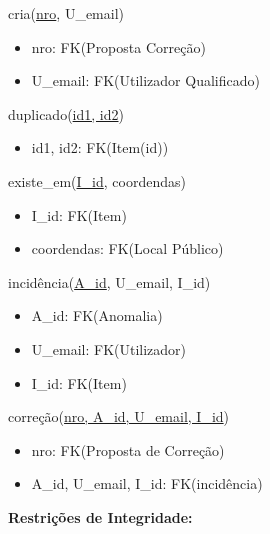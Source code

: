 \documentclass[12pt]{report}
\begin{document}
\begin{multicols}{2}
\vspace{5mm}


cria(\underline{nro}, U\_email)
    \begin{itemize}
    \item nro: FK(Proposta Correção)
    \item U\_email: FK(Utilizador Qualificado)
    \end{itemize}   


\vspace{5mm}



duplicado(\underline{id1, id2})
    \begin{itemize}
	    \item id1, id2: FK(Item(id))
    \end{itemize}


\vspace{5mm}


existe\_em(\underline{I\_id}, coordendas)
    \begin{itemize}
    \item I\_id: FK(Item)
    \item coordendas: FK(Local Público)
    \end{itemize}


\vspace{5mm}


incidência(\underline{A\_id}, U\_email, I\_id)
    \begin{itemize}
    \item A\_id: FK(Anomalia)
    \item U\_email: FK(Utilizador)
    \item I\_id: FK(Item)
    \end{itemize}


\vspace{5mm}


correção(\underline{nro, A\_id, U\_email, I\_id})
    \begin{itemize}
    \item nro: FK(Proposta de Correção)
    \item A\_id, U\_email, I\_id: FK(incidência)
    \end{itemize}

\end{multicols}

\Large
\textbf{Restrições de Integridade: }\\
\end{document}
